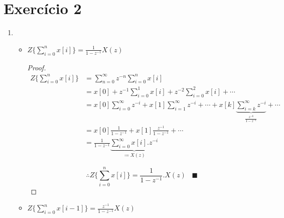 \section*{Exercício 2}

    \begin{enumerate}
        \item %
            \begin{itemize}
            	\item $Z\{\sum_{i=0}^{n}x[i] \} = \frac{1}{1-z^{-1}}X(z)$
            	
            	\begin{proof}
            	\begin{equation}
            	\begin{split}
            	Z\{\sum_{i=0}^{n}x[i] \} & = \sum_{n=0}^{\infty} z^{-n} \sum_{i=0}^{n} x[i] \\
            	& = x[0] + z^{-1} \sum_{i=0}^{1} x[i] + z^{-2} \sum_{i=0}^{2} x[i] + \cdots \\
            	& = x[0] \sum_{i=0}^{\infty} z^{-i} + x[1] \sum_{i=1}^{\infty} z^{-i} + \cdots + x[k] 
            	\underbrace{\sum_{i=k}^{\infty} z^{-i}}_{\frac{z^{-k}}{1 - z^{-1}}} + \cdots\\
            	& = x[0] \frac{1}{1 - z^{-1}} + x[1] \frac{z^{-1}}{1 - z^{-1}} + \cdots \\
            	& = \frac{1}{1 - z^{-1}} \underbrace{\sum_{i=0}^{\infty} x[i].z^{-i}}_{\coloneqq X(z)}
            	\end{split}
            	\end{equation}
            
            	\begin{equation}
            	\therefore Z\{\sum_{i=0}^{n}x[i] \} = \frac{1}{1-z^{-1}}.X(z) \hspace{10pt} \blacksquare
            	\end{equation}
            	\end{proof}
            	
            	\item $Z\{\sum_{i=0}^{n}x[i-1] \} = \frac{z^{-1}}{1-z^{-1}}X(z)$
                

\end{itemize}
\end{enumerate}
